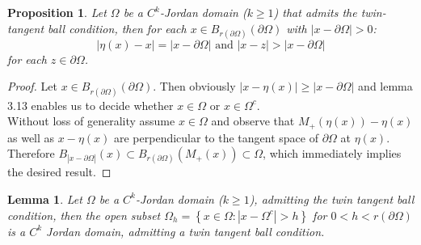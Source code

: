 \documentclass[11pt,a4paper,leqno]{report}
\newtheorem{proposition}{Proposition}[chapter]
\newtheorem{lemma}[theorem]{Lemma}
\numberwithin{equation}{chapter}
\begin{document}
\begin{proposition} Let $\Omega$ be a $C^k$-Jordan domain ($k\geq 1$) that admits the twin-tangent ball condition, then for each $x\in B_{r(\partial\Omega)}(\partial\Omega)$ with $|x-\partial\Omega|>0$:
\begin{equation}|\eta(x)-x|=|x-\partial\Omega|\text{ and } |x-z|>|x-\partial\Omega|\end{equation}
for each $z\in \partial\Omega$.
\end{proposition}
\begin{proof}
Let $x\in B_{r(\partial\Omega)}(\partial\Omega)$. Then obviously $|x-\eta(x)|\geq |x-\partial\Omega|$ and lemma 3.13 enables us to decide whether $x\in\Omega$ or $x\in\Omega^c$.\\
Without loss of generality assume $x\in\Omega$ and observe that $M_+(\eta(x))-\eta(x)$ as well as $x-\eta(x)$ are perpendicular to the tangent space of $\partial\Omega$ at $\eta(x)$. Therefore $B_{|x-\partial\Omega|}(x)\subset B_{r(\partial\Omega)}(M_+(x))\subset\Omega$, which immediately implies the desired result.
\end{proof}
\begin{lemma} Let $\Omega$ be a $C^k$-Jordan domain ($k\geq 1$), admitting the twin tangent ball condition, then the open subset $\Omega_h=\left\{x\in\Omega: |x-\Omega^c|>h\right\}$ for $0<h<r(\partial\Omega)$ is a $C^k$ Jordan domain, admitting a twin tangent ball condition.\end{lemma}
\end{document}
